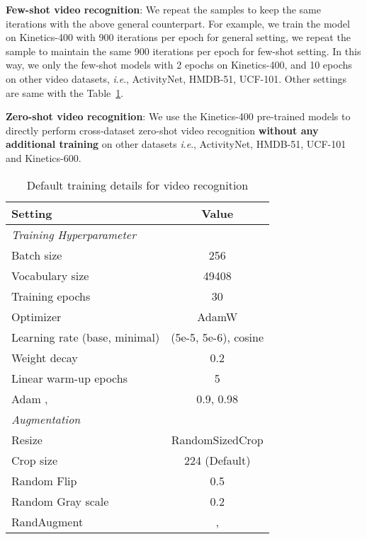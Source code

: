 \documentclass[letterpaper]{article} \usepackage{aaai23}  \usepackage{times}  \usepackage{helvet}  \usepackage{courier}  \usepackage[hyphens]{url}  \usepackage{graphicx} \urlstyle{rm} \def\UrlFont{\rm}  \usepackage{natbib}  \usepackage{caption} \frenchspacing  \setlength{\pdfpagewidth}{8.5in}  \setlength{\pdfpageheight}{11in}  \usepackage{algorithm}
\newcommand{\ie}{\textit{i}.\textit{e}.}
\begin{document}
\noindent\textbf{Few-shot video recognition}:
We repeat the samples to keep the same iterations with the above general counterpart. For example, we train the model on Kinetics-400 with 900 iterations per epoch for general setting, we repeat the sample to maintain the same 900 iterations per epoch for few-shot setting. In this way, we only the few-shot models with 2 epochs on Kinetics-400, and 10 epochs on other video datasets, \ie, ActivityNet, HMDB-51, UCF-101. Other settings are same with the Table~\ref{tb:imp}.

\noindent\textbf{Zero-shot video recognition}: We use the Kinetics-400 pre-trained models to directly perform cross-dataset zero-shot video recognition \textbf{without any additional training} on other datasets \ie, ActivityNet, HMDB-51, UCF-101 and Kinetics-600.

\begin{table}[h!]
\centering
\begin{tabular}{l|c} \toprule
    Setting  & Value \\ \midrule
    \multicolumn{2}{l}{\cellcolor{mygray}\emph{Training Hyperparameter}} \\
    Batch size & 256 \\
    Vocabulary size & 49408 \\
    Training epochs & 30 \\
    Optimizer & AdamW \\
    Learning rate (base, minimal) & (5e-5, 5e-6), cosine \\
    Weight decay & 0.2 \\
    Linear warm-up epochs & 5 \\
    Adam , & 0.9, 0.98 \\ \midrule
    \multicolumn{2}{l}{\cellcolor{mygray}\emph{Augmentation}} \\
    Resize & RandomSizedCrop \\
    Crop size & 224 (Default) \\
Random Flip & 0.5 \\
    Random Gray scale & 0.2 \\
    RandAugment & ,  \\
    \bottomrule
\end{tabular}
\caption{Default training details for video recognition}
\label{tb:imp}
\end{table}
\end{document}

